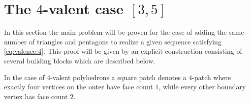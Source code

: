 \section{The $4$-valent case $[3, 5]$}
In this section the main problem will be proven for the case of adding the same number of triangles and pentagons to realize a given sequence satisfying \autoref{eq:valence:4}. This proof will be given by an explicit construction consisting of several building blocks which are described below.

\begin{definition}\label{def:square:patch}
  In the case of $4$-valent polyhedrons a square patch denotes a $4$-patch where exactly four vertices on the outer have face  count $1$, while every other boundary vertex has face count $2$.
\end{definition}


